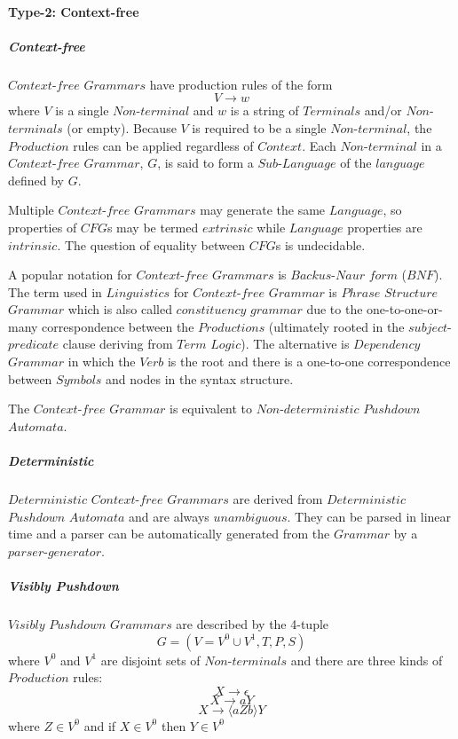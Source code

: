 \documentclass{article}
\begin{document}
\paragraph{Type-2: Context-free}

    \subparagraph{Context-free}
    $Context$-$free$ $Grammars$ have production rules of the form
    \[
        V \rightarrow w
    \]
    where $V$ is a single $Non$-$terminal$ and $w$ is a string of
    $Terminals$ and/or $Non$-$terminals$ (or empty). Because $V$ is
    required to be a single $Non$-$terminal$, the $Production$ rules
    can be applied regardless of $Context$. Each $Non$-$terminal$ in a
    $Context$-$free$ $Grammar$, $G$, is said to form a
    $Sub$-$Language$ of the $language$ defined by $G$.

    Multiple $Context$-$free$ $Grammars$ may generate the same
    $Language$, so properties of $CFG$s may be termed $extrinsic$
    while $Language$ properties are $intrinsic$. The question of
    equality between $CFG$s is undecidable.

    A popular notation for $Context$-$free$ $Grammars$ is
    $Backus$-$Naur$ $form$ ($BNF$). The term used in $Linguistics$ for
    $Context$-$free$ $Grammar$ is $Phrase$ $Structure$ $Grammar$ which
    is also called $constituency$ $grammar$ due to the
    one-to-one-or-many correspondence between the $Productions$
    (ultimately rooted in the $subject$-$predicate$ clause deriving
    from $Term$ $Logic$). The alternative is $Dependency$ $Grammar$ in
    which the $Verb$ is the root and there is a one-to-one
    correspondence between $Symbols$ and nodes in the syntax
    structure.

    The $Context$-$free$ $Grammar$ is equivalent to
    $Non$-$deterministic$ $Pushdown$ $Automata$.

    \subparagraph{Deterministic}
    $Deterministic$ $Context$-$free$ $Grammars$ are derived from
    $Deterministic$ $Pushdown$ $Automata$ and are always
    $unambiguous$. They can be parsed in linear time and a parser can
    be automatically generated from the $Grammar$ by a
    $parser$-$generator$.

    \subparagraph{Visibly Pushdown}
    $Visibly$ $Pushdown$ $Grammars$ are described by the 4-tuple
    \[
        G = (V=V^0 \cup V^1,T,P,S)
    \]
    where $V^0$ and $V^1$ are disjoint sets of $Non$-$terminals$ and
    there are three kinds of $Production$ rules:
    \[
        X \rightarrow \epsilon
    \]\[
        X \rightarrow aY
    \]\[
        X \rightarrow \langle aZb \rangle Y
    \]
    where $Z \in V^0$ and if $X \in V^0$ then $Y \in V^0$
\end{document}
